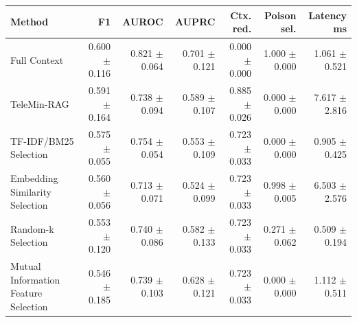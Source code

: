 \begin{tabular}{lrrrrrr}
\toprule
Method & F1 & AUROC & AUPRC & Ctx. red. & Poison sel. & Latency ms \\
\midrule
Full Context & 0.600 $\pm$ 0.116 & 0.821 $\pm$ 0.064 & 0.701 $\pm$ 0.121 & 0.000 $\pm$ 0.000 & 1.000 $\pm$ 0.000 & 1.061 $\pm$ 0.521 \\
TeleMin-RAG & 0.591 $\pm$ 0.164 & 0.738 $\pm$ 0.094 & 0.589 $\pm$ 0.107 & 0.885 $\pm$ 0.026 & 0.000 $\pm$ 0.000 & 7.617 $\pm$ 2.816 \\
TF-IDF/BM25 Selection & 0.575 $\pm$ 0.055 & 0.754 $\pm$ 0.054 & 0.553 $\pm$ 0.109 & 0.723 $\pm$ 0.033 & 0.000 $\pm$ 0.000 & 0.905 $\pm$ 0.425 \\
Embedding Similarity Selection & 0.560 $\pm$ 0.056 & 0.713 $\pm$ 0.071 & 0.524 $\pm$ 0.099 & 0.723 $\pm$ 0.033 & 0.998 $\pm$ 0.005 & 6.503 $\pm$ 2.576 \\
Random-k Selection & 0.553 $\pm$ 0.120 & 0.740 $\pm$ 0.086 & 0.582 $\pm$ 0.133 & 0.723 $\pm$ 0.033 & 0.271 $\pm$ 0.062 & 0.509 $\pm$ 0.194 \\
Mutual Information Feature Selection & 0.546 $\pm$ 0.185 & 0.739 $\pm$ 0.103 & 0.628 $\pm$ 0.121 & 0.723 $\pm$ 0.033 & 0.000 $\pm$ 0.000 & 1.112 $\pm$ 0.511 \\
\bottomrule
\end{tabular}

